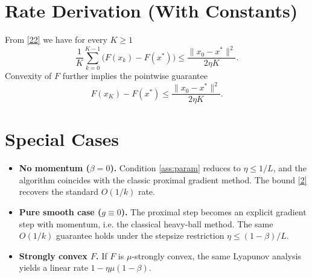 \documentclass{article}
\begin{document}
\section*{Rate Derivation (With Constants)}
From \eqref{22} we have for every $K\ge1$
\[
\frac{1}{K}\sum_{k=0}^{K-1}\bigl(F(x_{k})-F(x^{*})\bigr)
\le \frac{\|x_{0}-x^{*}\|^{2}}{2\eta K}.
\]
Convexity of $F$ further implies the pointwise guarantee
\[
F(x_{K})-F(x^{*})\le \frac{\|x_{0}-x^{*}\|^{2}}{2\eta K}.
\]

\section*{Special Cases}
\begin{itemize}[nosep]
\item \textbf{No momentum ($\beta=0$).} Condition \eqref{ass:param} reduces to $\eta\le 1/L$, and the algorithm coincides with the classic proximal gradient method. The bound \eqref{2} recovers the standard $O(1/k)$ rate.
\item \textbf{Pure smooth case ($g\equiv0$).} The proximal step becomes an explicit gradient step with momentum, i.e. the classical heavy‑ball method. The same $O(1/k)$ guarantee holds under the stepsize restriction $\eta\le (1-\beta)/L$.
\item \textbf{Strongly convex $F$.} If $F$ is $\mu$‑strongly convex, the same Lyapunov analysis yields a linear rate $1-\eta\mu(1-\beta)$.
\end{itemize}
\end{document}
